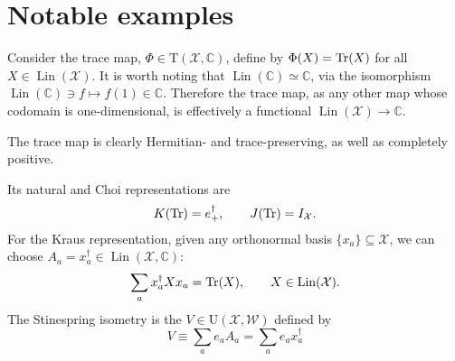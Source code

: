 \documentclass[12pt]{report}
\newcommand{\CC}{\mathbb{C}}
\newcommand{\calW}{{\mathcal{W}}}
\newcommand{\calX}{{\mathcal{X}}}
\newcommand{\rmT}{{\mathrm{T}}}
\newcommand{\rmU}{{\mathrm{U}}}
\DeclareMathOperator{\Lin}{Lin}
\begin{document}
\section{Notable examples}

\begin{example}
	Consider the trace map, $\Phi\in\rmT(\calX,\CC)$, define by $\Phi(X)=\Tr(X)$ for all $X\in\Lin(\calX)$.
	It is worth noting that $\Lin(\CC)\simeq \CC$, via the isomorphism
	$\Lin(\CC)\ni f\mapsto f(1)\in\CC$.
	Therefore the trace map, as any other map whose codomain is one-dimensional, is effectively a functional $\Lin(\calX)\to\CC$.

	The trace map is clearly Hermitian- and trace-preserving, as well as completely positive.

	Its natural and Choi representations are
	\begin{equation}
		K(\Tr) = e_+^\dagger,
		\qquad J(\Tr) = I_{\calX}.
	\end{equation}
	For the Kraus representation, given any orthonormal basis $\{x_a\}\subseteq\calX$, we can choose $A_a=x_a^\dagger\in\Lin(\calX,\CC)$:
	\begin{equation}
		\sum_a x_a^\dagger X x_a = \Tr(X),
		\qquad X\in\Lin(\calX).
	\end{equation}
	The Stinespring isometry is the $V\in\rmU(\calX,\calW)$ defined by
	\begin{equation}
		V \equiv \sum_a e_a A_a = \sum_a e_a x_a^\dagger
	\end{equation}
\end{example}
\end{document}
